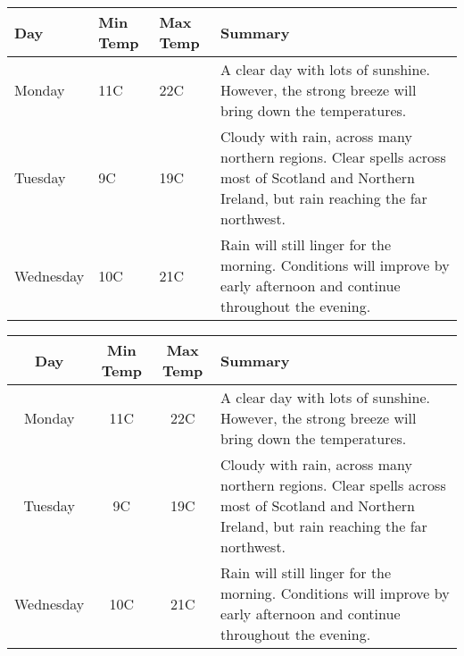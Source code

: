 \begin{center}
    \begin{tabular}{ l  l  l  p{5cm}}
        \hline
        Day       & Min Temp & Max Temp & Summary                                                      \\ \hline
        Monday    & 11C      & 22C      & A clear day with lots of sunshine.
        However, the strong breeze will bring down the temperatures.                                   \\ \hline
        Tuesday   & 9C       & 19C      & Cloudy with rain, across many northern regions. Clear spells
        across most of Scotland and Northern Ireland,
        but rain reaching the far northwest.                                                           \\ \hline
        Wednesday & 10C      & 21C      & Rain will still linger for the morning.
        Conditions will improve by early afternoon and continue
        throughout the evening.                                                                        \\
        \hline
    \end{tabular}
\end{center}







%


\begin{center}
    \begin{tabularx}{\textwidth}{ cccX }
        \hline
        Day       & Min Temp & Max Temp & Summary                                                      \\ \hline
        Monday    & 11C      & 22C      & A clear day with lots of sunshine.
        However, the strong breeze will bring down the temperatures.                                   \\ \hline
        Tuesday   & 9C       & 19C      & Cloudy with rain, across many northern regions. Clear spells
        across most of Scotland and Northern Ireland,
        but rain reaching the far northwest.                                                           \\ \hline
        Wednesday & 10C      & 21C      & Rain will still linger for the morning.
        Conditions will improve by early afternoon and continue
        throughout the evening.                                                                        \\
        \hline
    \end{tabularx}
\end{center}



